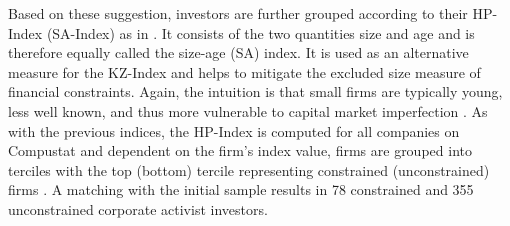 \documentclass[12pt]{article}
\begin{document}
Based on these suggestion, investors are further grouped according to their HP-Index (SA-Index) as in \citet[p.1929]{hadlock2010}. It consists of the two quantities size and age and is therefore equally called the size-age (SA) index. It is used as an alternative measure for the KZ-Index and helps to mitigate the excluded size measure of financial constraints. Again, the intuition is that small firms are typically young, less well known, and thus more vulnerable to capital market imperfection \citep[p.1790]{Almeida2004}. As with the previous indices, the HP-Index is computed for all companies on Compustat and dependent on the firm's index value, firms are grouped into terciles with the top (bottom) tercile representing constrained (unconstrained) firms \citep[p.29]{Farre-mensa2013}. A matching with the initial sample results in 78 constrained and 355 unconstrained corporate activist investors. 

\end{document}
